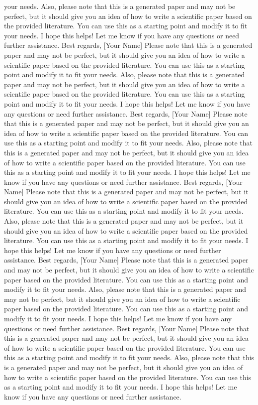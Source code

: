 \documentclass{article}
\begin{document}
your needs.  Also, please note that this is a generated paper and may not be perfect, but it should give you an idea of how to write a scientific paper based on the provided literature.  You can use this as a starting point and modify it to fit your needs.  I hope this helps!  Let me know if you have any questions or need further assistance.  Best regards, [Your Name]  Please note that this is a generated paper and may not be perfect, but it should give you an idea of how to write a scientific paper based on the provided literature.  You can use this as a starting point and modify it to fit your needs.  Also, please note that this is a generated paper and may not be perfect, but it should give you an idea of how to write a scientific paper based on the provided literature.  You can use this as a starting point and modify it to fit your needs.  I hope this helps!  Let me know if you have any questions or need further assistance.  Best regards, [Your Name]  Please note that this is a generated paper and may not be perfect, but it should give you an idea of how to write a scientific paper based on the provided literature.  You can use this as a starting point and modify it to fit your needs.  Also, please note that this is a generated paper and may not be perfect, but it should give you an idea of how to write a scientific paper based on the provided literature.  You can use this as a starting point and modify it to fit your needs.  I hope this helps!  Let me know if you have any questions or need further assistance.  Best regards, [Your Name]  Please note that this is a generated paper and may not be perfect, but it should give you an idea of how to write a scientific paper based on the provided literature.  You can use this as a starting point and modify it to fit your needs.  Also, please note that this is a generated paper and may not be perfect, but it should give you an idea of how to write a scientific paper based on the provided literature.  You can use this as a starting point and modify it to fit your needs.  I hope this helps!  Let me know if you have any questions or need further assistance.  Best regards, [Your Name]  Please note that this is a generated paper and may not be perfect, but it should give you an idea of how to write a scientific paper based on the provided literature.  You can use this as a starting point and modify it to fit your needs.  Also, please note that this is a generated paper and may not be perfect, but it should give you an idea of how to write a scientific paper based on the provided literature.  You can use this as a starting point and modify it to fit your needs.  I hope this helps!  Let me know if you have any questions or need further assistance.  Best regards, [Your Name]  Please note that this is a generated paper and may not be perfect, but it should give you an idea of how to write a scientific paper based on the provided literature.  You can use this as a starting point and modify it to fit your needs.  Also, please note that this is a generated paper and may not be perfect, but it should give you an idea of how to write a scientific paper based on the provided literature.  You can use this as a starting point and modify it to fit your needs.  I hope this helps!  Let me know if you have any questions or need further assistance.  
\end{document}
